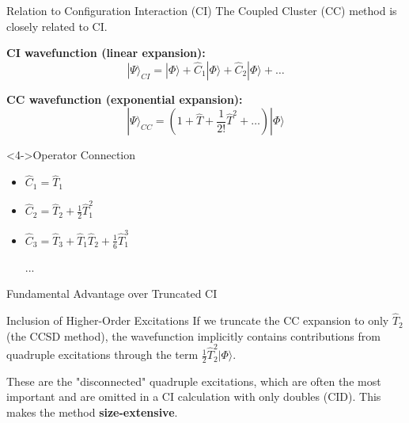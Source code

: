 \begin{frame}{Relation to Configuration Interaction (CI)}
    The Coupled Cluster (CC) method is closely related to CI.
    \pause
    
    \textbf{CI wavefunction (linear expansion):}
    \[
    |\Psi\rangle_{CI} = |\Phi\rangle + \hat{C}_1|\Phi\rangle + \hat{C}_2|\Phi\rangle + \dots
    \]
    \pause
    
    \textbf{CC wavefunction (exponential expansion):}
    \[
    |\Psi\rangle_{CC} = \left(1 + \hat{T} + \frac{1}{2!}\hat{T}^2 + \dots \right) |\Phi\rangle
    \]
    \pause
    
    \begin{block}<4->{Operator Connection}
        \begin{itemize}
            \item $\hat{C}_1 = \hat{T}_1$
            \item $\hat{C}_2 = \hat{T}_2 + \frac{1}{2}\hat{T}_1^2$
            \item $\hat{C}_3 = \hat{T}_3 + \hat{T}_1\hat{T}_2 + \frac{1}{6}\hat{T}_1^3$
            \item[...]
        \end{itemize}
    \end{block}
\end{frame}

\begin{frame}{Fundamental Advantage over Truncated CI}
    \begin{alertblock}{Inclusion of Higher-Order Excitations}
        If we truncate the CC expansion to only $\hat{T}_2$ (the CCSD method), the wavefunction implicitly contains contributions from quadruple excitations through the term $\frac{1}{2}\hat{T}_2^2|\Phi\rangle$.
        \pause
        \vspace{1em}
        
        These are the "disconnected" quadruple excitations, which are often the most important and are omitted in a CI calculation with only doubles (CID). \pause This makes the method \textbf{size-extensive}.
    \end{alertblock}
\end{frame}

